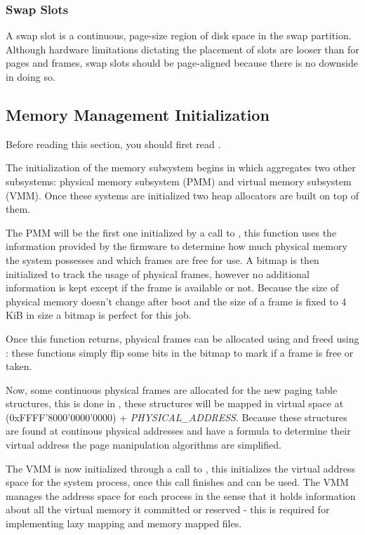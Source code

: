\subsubsection{Swap Slots}

A swap slot is a continuous, page-size region of disk space in the swap partition. Although hardware
limitations dictating the placement of slots are looser than for pages and frames, swap slots should
be page-aligned because there is no downside in doing so.

\subsection{Memory Management Initialization}

Before reading this section, you should first read .

The initialization of the memory subsystem begins in  which aggregates two
other subsystems: physical memory subsystem (PMM) and virtual memory subsystem (VMM). Once these
systems are initialized two heap allocators are built on top of them.

The PMM will be the first one initialized by a call to , this function uses the
information provided by the firmware to determine how much physical memory the system possesses and
which frames are free for use. A bitmap is then initialized to track the usage of physical frames,
however no additional information is kept except if the frame is available or not. Because the size
of physical memory doesn't change after boot and the size of a frame is fixed to 4 KiB in size a
bitmap is perfect for this job.

Once this function returns, physical frames can be allocated using  and
freed using : these functions simply flip some bits in the bitmap to mark if
a frame is free or taken.

Now, some continuous physical frames are allocated for the new paging table structures, this is done
in , these structures will be mapped in virtual space at
 (0xFFFF'8000'0000'0000) + \textit{PHYSICAL\_ADDRESS}. Because these
structures are found at continous physical addresses and have a formula to determine their virtual
address the page manipulation algorithms are simplified.

The VMM is now initialized through a call to , this initializes the virtual address
space for the system process, once this call finishes  and 
 can be used. The VMM manages the address space for each process in the sense
that it holds information about all the virtual memory it committed or reserved - this is required
for implementing lazy mapping and memory mapped files.

